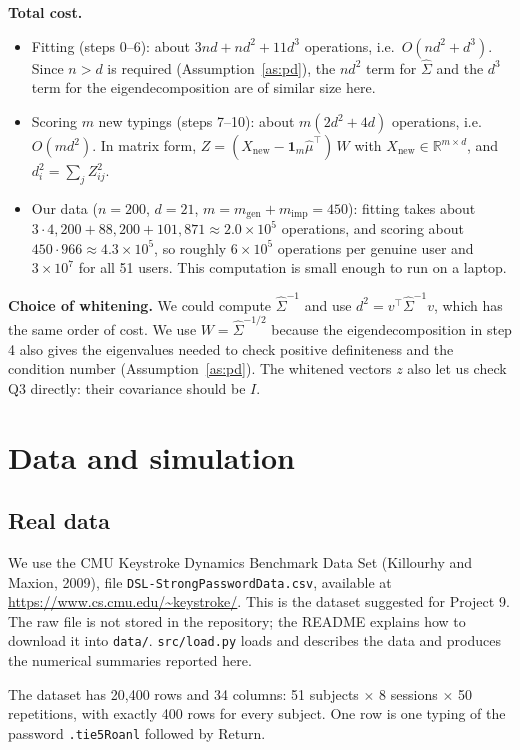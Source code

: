 \documentclass[11pt]{article}
\theoremstyle{definition}
\newcommand{\R}{\mathbb{R}}
\newcommand{\T}{^{\top}}
\begin{document}
\noindent\textbf{Total cost.}
\begin{itemize}
\item Fitting (steps 0--6): about $3nd+nd^2+11d^3$ operations, i.e.\ $O(nd^2+d^3)$. Since $n>d$ is required (Assumption~\ref{as:pd}), the $nd^2$ term for $\hat\Sigma$ and the $d^3$ term for the eigendecomposition are of similar size here.
\item Scoring $m$ new typings (steps 7--10): about $m(2d^2+4d)$ operations, i.e.\ $O(md^2)$. In matrix form, $Z=(X_{\text{new}}-\mathbf 1_m\hat\mu\T)\,W$ with $X_{\text{new}}\in\R^{m\times d}$, and $d^2_i=\sum_j Z_{ij}^2$.
\item Our data ($n=200$, $d=21$, $m=m_{\text{gen}}+m_{\text{imp}}=450$): fitting takes about $3\cdot4{,}200+88{,}200+101{,}871\approx2.0\times10^5$ operations, and scoring about $450\cdot966\approx4.3\times10^5$, so roughly $6\times10^5$ operations per genuine user and $3\times10^7$ for all 51 users. This computation is small enough to run on a laptop.
\end{itemize}

\noindent\textbf{Choice of whitening.} We could compute $\hat\Sigma^{-1}$ and use $d^2=v\T\hat\Sigma^{-1}v$, which has the same order of cost. We use $W=\hat\Sigma^{-1/2}$ because the eigendecomposition in step 4 also gives the eigenvalues needed to check positive definiteness and the condition number (Assumption~\ref{as:pd}). The whitened vectors $z$ also let us check Q3 directly: their covariance should be $I$.

\section{Data and simulation}
\subsection{Real data}
We use the CMU Keystroke Dynamics Benchmark Data Set (Killourhy and Maxion, 2009), file \texttt{DSL-StrongPasswordData.csv}, available at \url{https://www.cs.cmu.edu/~keystroke/}. This is the dataset suggested for Project 9. The raw file is not stored in the repository; the README explains how to download it into \texttt{data/}. \texttt{src/load.py} loads and describes the data and produces the numerical summaries reported here.

The dataset has 20,400 rows and 34 columns: 51 subjects $\times$ 8 sessions $\times$ 50 repetitions, with exactly 400 rows for every subject. One row is one typing of the password \texttt{.tie5Roanl} followed by Return.
\end{document}

